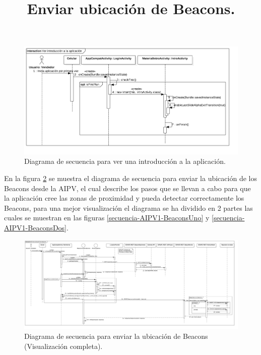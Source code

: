 \FloatBarrier
\begin{figure}[htbp!]
		\centering
			\includegraphics[width=1.1 \textwidth]{imagenes/adrian/vendedor/prototipo1/intro_app}
		\caption{Diagrama de secuencia para ver una introducción a la aplicación.}
		\label{secuencia-AIPV1-intro}
\end{figure}
\FloatBarrier

\title{\textbf{Enviar ubicación de Beacons.}\\}

En la figura \ref{secuencia-AIPV1-Beacons} se muestra el diagrama de secuencia para enviar la ubicación de los Beacons desde la AIPV, el cual describe los pasos que se llevan a cabo para que la aplicación cree las zonas de proximidad y pueda detectar correctamente los Beacons, para una mejor visualización el diagrama se ha dividido en 2 partes las cuales se muestran en las figuras \ref{secuencia-AIPV1-BeaconsUno} y \ref{secuencia-AIPV1-BeaconsDos}.

\FloatBarrier
\begin{figure}[htbp!]
		\centering
			\includegraphics[width=1 \textwidth]{imagenes/adrian/vendedor/prototipo1/enviar_Beacons}
		\caption{Diagrama de secuencia para enviar la ubicación de Beacons (Visualización completa).}
		\label{secuencia-AIPV1-Beacons}
\end{figure}
\FloatBarrier

